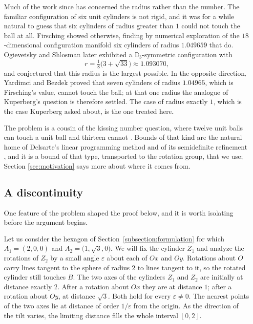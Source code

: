 \documentclass[reqno]{amsart}
\theoremstyle{definition}
\begin{document}
Much of the work since has concerned the radius rather than the number. The familiar configuration
of six unit cylinders is not rigid, and it was for a while natural to guess that six cylinders of
radius greater than $1$ could not touch the ball at all. Firsching \cite{F} showed otherwise,
finding by numerical exploration of the $18$-dimensional configuration manifold six cylinders of
radius $1.049659$ that do. Ogievetsky and Shlosman \cite{OS} later exhibited a
$\mathbb{D}_3$-symmetric configuration with
\[
r=\tfrac18\bigl(3+\sqrt{33}\bigr)\approx1.093070,
\]
and conjectured that this radius is the largest possible. In the opposite direction, Yardimci and
Bezdek \cite{Yar} proved that seven cylinders of radius $1.04965$, which is Firsching's value,
cannot touch the ball; at that one radius the analogue of Kuperberg's question is therefore
settled. The case of radius exactly $1$, which is the case Kuperberg asked about, is the one
treated here.

The problem is a cousin of the kissing number question, where twelve unit balls can touch a unit
ball and thirteen cannot \cite{SW}. Bounds of that kind are the natural home of Delsarte's linear
programming method and of its semidefinite refinement \cite{BV}, and it is a bound of that type,
transported to the rotation group, that we use; Section \ref{sec:motivation} says more about where it
comes from.

\subsection{A discontinuity}\label{subsection:discontinuity}

One feature of the problem shaped the proof below, and it is worth isolating before the argument
begins.

Let us consider the hexagon of Section~\ref{subsection:formulation} for which $A_1=(2,0,0)$ and
$A_2=\bigl(1,\sqrt3,0\bigr)$. We will fix the cylinder $Z_1$ and analyze the rotations of 
$Z_2$ by a small angle $\varepsilon$ about each of $Ox$ and $Oy$. Rotations about $O$ carry lines 
tangent to the sphere of radius $2$ to lines
tangent to it, so the rotated cylinder still touches $B$. The two axes of the cylinders $Z_1$ and $Z_2$ 
are initially at distance exactly 
$2$. After a rotation about $Ox$ they are at distance $1$; after a rotation about $Oy$, at distance
$\sqrt3$. Both hold for every $\varepsilon\ne0$. The nearest points of the two axes lie at distance of order $1/\varepsilon$ from the origin. As the direction of the tilt varies,
the limiting distance fills the whole interval $[0,2]$.  
\end{document}
